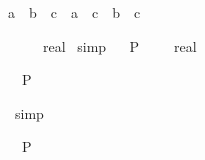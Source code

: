 \begin{isabellebody}
\begin{isamarkuptext}
\begin{isabelle}%
{}a\ {}\ b{}\ {}\ c\ {}\ a\ {}\ c\ {}\ b\ {}\ c%
\end{isabelle}
%
\end{isamarkuptext}%
\isamarkuptrue%
\isamarkupfalse%
\ {}{}{}{}\ {}\ {}{}{}{}\ {}{}\ real{}{}\isanewline
%
\isadelimproof
%
\endisadelimproof
%
\isatagproof
{}\isamarkupfalse%
\ simp%
\endisatagproof
{\isafoldproof}%
%
\isadelimproof
\ \isanewline
%
\endisadelimproof
\isanewline
{}\isamarkupfalse%
\ {}P\ {}{}{}{}{}{}\ {}\ {}{}{}{}{}\ {}{}\ real{}{}{}%
\isadelimproof
%
\endisadelimproof
%
\isatagproof
%
\begin{isamarkuptxt}%
\begin{isabelle}%
\ {}{}\ P\ {}{}\ {}\ {}\ {}\ {}{}\ {}\ {}{}{}{}%
\end{isabelle}%
\end{isamarkuptxt}%
\isamarkuptrue%
\isamarkupfalse%
\ simp%
\begin{isamarkuptxt}%
\begin{isabelle}%
\ {}{}\ P\ {}{}\ {}\ {}{}%

\end{isabelle}
\end{isamarkuptxt}
\end{isabellebody}
